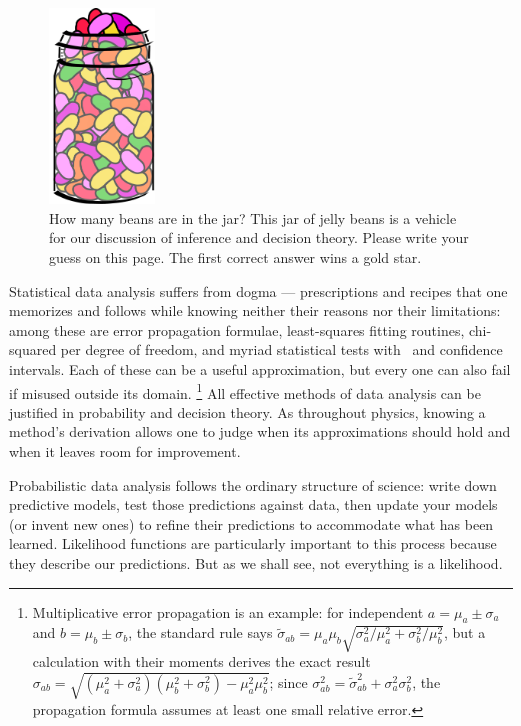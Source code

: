 \begin{figure}[tp]
\centering
\includegraphics[width=0.25\textwidth]{figures/searches_beans.pdf}
\caption[
How many beans are in the jar?
]{%
How many beans are in the jar? This jar of jelly beans is a vehicle for our
discussion of inference and decision theory.
Please write your guess on this page.
The first correct answer wins a gold star.
}
\label{fig:searches_beans}
\end{figure}

Statistical data analysis suffers from dogma --- prescriptions and recipes that
one memorizes and follows while knowing neither their reasons nor their
limitations:
among these are
error propagation formulae,
least-squares fitting routines,
chi-squared per degree of freedom,
and myriad statistical tests with \pvalues\ and confidence intervals.
Each of these can be a useful approximation, but every one can also fail if
misused outside its domain.%
\footnote{%
Multiplicative error propagation is an example:
for independent $a = \mu_a \pm \sigma_a$ and $b = \mu_b \pm \sigma_b$,
the standard rule says
\(
\widetilde{\sigma}_{ab}
= \mu_a \mu_b \sqrt{\sigma_a^2/\mu_a^2 + \sigma_b^2/\mu_b^2}
\),
but a calculation with their moments derives the exact result
\(
\sigma_{ab}
= \sqrt{(\mu_a^2 + \sigma_a^2)(\mu_b^2 + \sigma_b^2) - \mu_a^2\mu_b^2}
\);
since $\sigma_{ab}^2 = \widetilde{\sigma}_{ab}^2 + \sigma_a^2 \sigma_b^2$,
the propagation formula assumes at least one small relative error.
}
All effective methods of data analysis can be justified in probability and
decision theory.
As throughout physics, knowing a method's derivation allows one to judge when
its approximations should hold and when it leaves room for improvement.

Probabilistic data analysis follows the ordinary structure of science:
write down predictive models, test those predictions against data,
then update your models (or invent new ones) to refine their predictions
to accommodate what has been learned.
Likelihood functions are particularly important to this process because they
describe our predictions.
But as we shall see, not everything is a likelihood.

